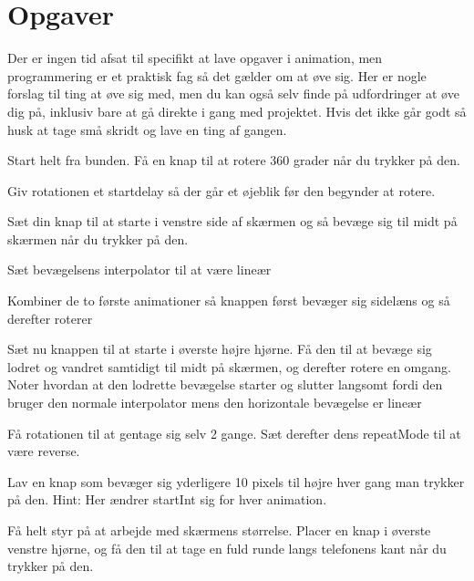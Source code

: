 \section{Opgaver}
Der er ingen tid afsat til specifikt at lave opgaver i animation, men programmering er et praktisk fag så det gælder om at øve sig. Her er nogle forslag til ting at øve sig med, men du kan også selv finde på udfordringer at øve dig på, inklusiv bare at gå direkte i gang med projektet. Hvis det ikke går godt så husk at tage små skridt og lave en ting af gangen.
\begin{exercise}
	Start helt fra bunden. Få en knap til at rotere 360 grader når du trykker på den.
\end{exercise}
\begin{exercise}
	Giv rotationen et startdelay så der går et øjeblik før den begynder at rotere.
\end{exercise}
\begin{exercise}
	Sæt din knap til at starte i venstre side af skærmen og så bevæge sig til midt på skærmen når du trykker på den.
\end{exercise}
\begin{exercise}
	Sæt bevægelsens interpolator til at være lineær
\end{exercise}
\begin{exercise}
	Kombiner de to første animationer så knappen først bevæger sig sidelæns og så derefter roterer
\end{exercise}
\begin{exercise}
	Sæt nu knappen til at starte i øverste højre hjørne. Få den til at bevæge sig lodret og vandret samtidigt til midt på skærmen, og derefter rotere en omgang. Noter hvordan at den lodrette bevægelse starter og slutter langsomt fordi den bruger den normale interpolator mens den horizontale bevægelse er lineær
\end{exercise}
\begin{exercise}
	Få rotationen til at gentage sig selv 2 gange. Sæt derefter dens repeatMode til at være reverse.
\end{exercise}
\begin{exercise}
	Lav en knap som bevæger sig yderligere 10 pixels til højre hver gang man trykker på den. Hint: Her ændrer startInt sig for hver animation.
\end{exercise}
\begin{exercise}
	Få helt styr på at arbejde med skærmens størrelse. Placer en knap i øverste venstre hjørne, og få den til at tage en fuld runde langs telefonens kant når du trykker på den. 
\end{exercise}
